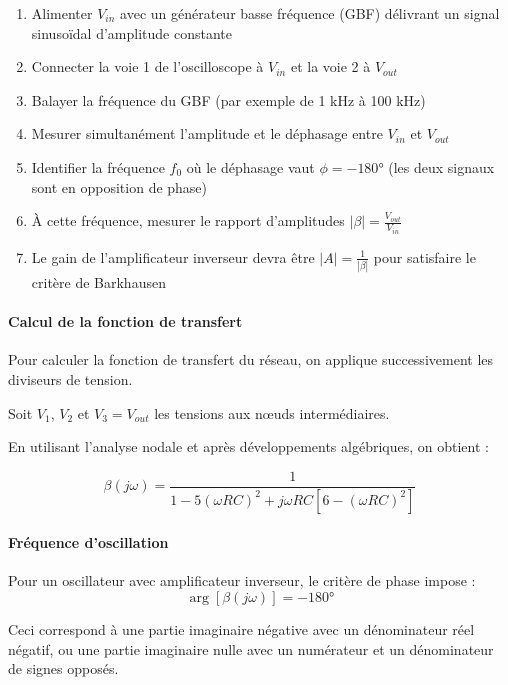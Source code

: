\documentclass[11pt,a4paper]{article}
\begin{document}
\begin{enumerate}
    \item Alimenter $V_{in}$ avec un générateur basse fréquence (GBF) délivrant un signal sinusoïdal d'amplitude constante
    \item Connecter la voie 1 de l'oscilloscope à $V_{in}$ et la voie 2 à $V_{out}$
    \item Balayer la fréquence du GBF (par exemple de 1 kHz à 100 kHz)
    \item Mesurer simultanément l'amplitude et le déphasage entre $V_{in}$ et $V_{out}$
    \item Identifier la fréquence $f_0$ où le déphasage vaut $\phi = -180°$ (les deux signaux sont en opposition de phase)
    \item À cette fréquence, mesurer le rapport d'amplitudes $|\beta| = \frac{V_{out}}{V_{in}}$
    \item Le gain de l'amplificateur inverseur devra être $|A| = \frac{1}{|\beta|}$ pour satisfaire le critère de Barkhausen
\end{enumerate}

\paragraph{Calcul de la fonction de transfert}

Pour calculer la fonction de transfert du réseau, on applique successivement les diviseurs de tension.

Soit $V_1$, $V_2$ et $V_3 = V_{out}$ les tensions aux nœuds intermédiaires.

En utilisant l'analyse nodale et après développements algébriques, on obtient :

\begin{equation}
\boxed{\beta(j\omega) = \frac{1}{1 - 5(\omega RC)^2 + j\omega RC[6 - (\omega RC)^2]}}
\end{equation}

\paragraph{Fréquence d'oscillation}

Pour un oscillateur avec amplificateur inverseur, le critère de phase impose :
\begin{equation}
\arg[\beta(j\omega)] = -180°
\end{equation}

Ceci correspond à une partie imaginaire négative avec un dénominateur réel négatif, ou une partie imaginaire nulle avec un numérateur et un dénominateur de signes opposés.
\end{document}
